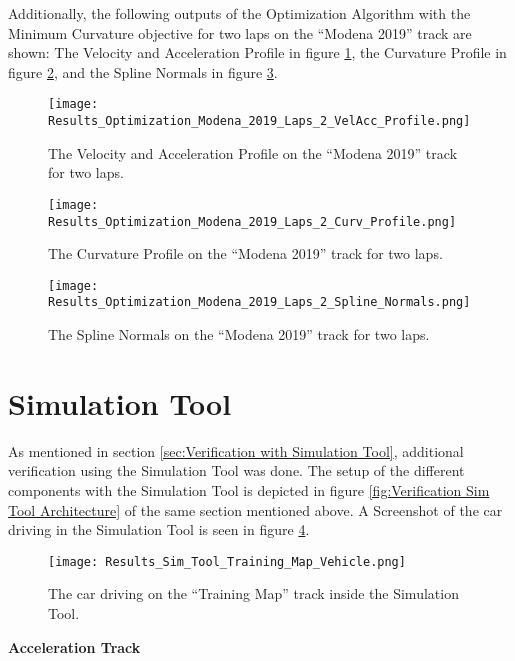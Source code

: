 Additionally, the following outputs of the Optimization Algorithm with the Minimum Curvature objective for two laps on the ``Modena 2019'' track are shown: The Velocity and Acceleration Profile in figure \ref{fig:Results Modena 2019 Laps 2 VelAcc Profile}, the Curvature Profile in figure \ref{fig:Results Modena 2019 Laps 2 Curv Profile}, and the Spline Normals in figure \ref{fig:Results Modena 2019 Laps 2 Spline Normals}.
\begin{figure}[H]
    \centering
    \texttt{[image: Results\_Optimization\_Modena\_2019\_Laps\_2\_VelAcc\_Profile.png]}
    \caption{The Velocity and Acceleration Profile on the ``Modena 2019'' track for two laps.}
    \label{fig:Results Modena 2019 Laps 2 VelAcc Profile}
\end{figure}
\begin{figure}[H]
    \centering
    \texttt{[image: Results\_Optimization\_Modena\_2019\_Laps\_2\_Curv\_Profile.png]}
    \caption{The Curvature Profile on the ``Modena 2019'' track for two laps.}
    \label{fig:Results Modena 2019 Laps 2 Curv Profile}
\end{figure}
\begin{figure}[H]
    \centering
    \texttt{[image: Results\_Optimization\_Modena\_2019\_Laps\_2\_Spline\_Normals.png]}
    \caption{The Spline Normals on the ``Modena 2019'' track for two laps.}
    \label{fig:Results Modena 2019 Laps 2 Spline Normals}
\end{figure}

\pagebreak

\section{Simulation Tool}
As mentioned in section \ref{sec:Verification with Simulation Tool}, additional verification using the Simulation Tool was done. The setup of the different components with the Simulation Tool is depicted in figure \ref{fig:Verification Sim Tool Architecture} of the same section mentioned above. A Screenshot of the car driving in the Simulation Tool is seen in figure \ref{fig:Results Sim Tool Training Map Vehicle}.
\begin{figure}[H]
    \centering
    \texttt{[image: Results\_Sim\_Tool\_Training\_Map\_Vehicle.png]}
    \caption{The car driving on the ``Training Map'' track inside the Simulation Tool.}
    \label{fig:Results Sim Tool Training Map Vehicle}
\end{figure}

\textbf{Acceleration Track}

